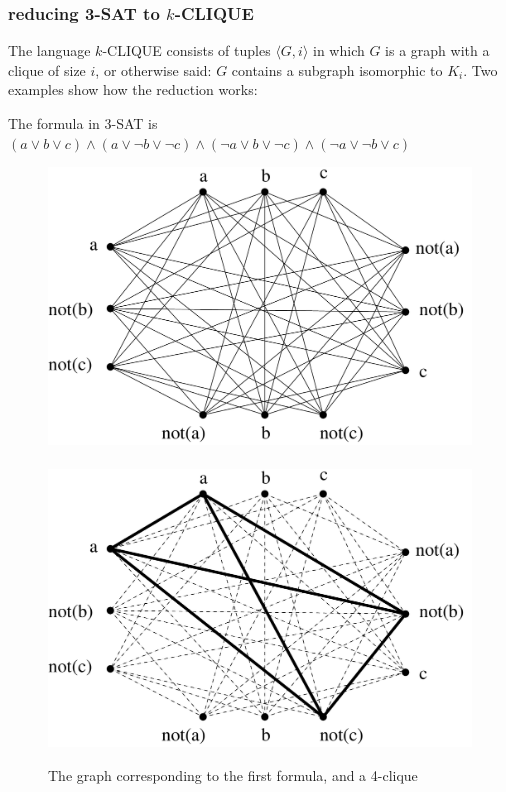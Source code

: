 \subsubsection{reducing 3-SAT to $k$-CLIQUE}

The language $k$-CLIQUE consists of tuples $\langle G,i \rangle$
in which $G$ is a graph with a clique of size $i$, or otherwise said:
$G$ contains a subgraph isomorphic to $K_i$. Two examples show how the
reduction works:

\begin{vb}
The formula in 3-SAT is
$(a \vee b \vee c) \wedge (a \vee \neg b \vee \neg c) \wedge (\neg a \vee b \vee \neg c) \wedge (\neg a \vee \neg b \vee c)$

\begin{figure}[h]
\begin{center}
\includegraphics[height=0.2\textheight,keepaspectratio]{satclique}
~~~~~~~~~\includegraphics[height=0.2\textheight,keepaspectratio]{satcliquesol}
\caption{The graph corresponding to the first formula, and a 
4-clique}\label{satclique}
\end{center}
\end{figure}


\end{vb}
